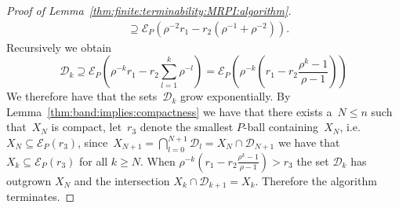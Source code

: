 \begin{proof}[Proof of Lemma~\ref{thm:finite:terminability:MRPI:algorithm}]
\begin{equation}
\begin{split}
	&\supseteq\mathcal E_P(\rho^{-2} r_1 - r_2(\rho^{-1}+\rho^{-2})).
\end{split}\end{equation}
%
Recursively we obtain 
%
\begin{equation}
	\mathscr D_k\supseteq\mathcal E_P\left(\rho^{-k}r_1-r_2\sum_{l=1}^{k}\rho^{-l}\right) = \mathcal E_P\left(
	\rho^{-k}\left(r_1 - r_2\frac{\rho^{k}-1}{\rho-1}\right)\right)
\end{equation}
%
We therefore have that the sets~$\mathscr D_k$ grow exponentially.
%
By Lemma~\ref{thm:band:implies:compactness} we have that there exists a~$N\leq n$ such that~$X_N$ is compact,
let~$r_3$ denote the smallest $P$-ball containing~$X_N$, i.e.~$X_N\subseteq\mathcal E_P(r_3)$, 
since~$X_{N+1} = \bigcap_{l=0}^{N+1}\mathscr D_l = X_N\cap\mathscr D_{N+1}$ we have that $X_{k}\subseteq
\mathcal E_P(r_3)$ for all $k\geq N$.
%
When $\rho^{-k}\left(r_1 - r_2\frac{\rho^{k}-1}{\rho-1}\right)>r_3$ the set $\mathscr D_k$ has outgrown 
$X_N$ and the intersection $X_k\cap\mathscr D_{k+1} = X_k$. 
%
Therefore the algorithm terminates.
\end{proof}
%
